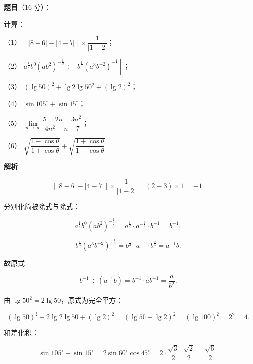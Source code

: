 \begin{answer}

\textbf{题目}（16 分）：

计算：

（1） $\left[\left|8-6\right|-\left|4-7\right|\right]\times\dfrac{1}{\left|1-2\right|}$；

（2） $a^{\frac12}b^0\left(ab^2\right)^{-\frac12}\div\left[b^{\frac13}\left(a^3b^{-2}\right)^{-\frac13}\right]$；

（3） $\left(\lg 50\right)^2+\lg 2\lg 50^2+\left(\lg 2\right)^2$；

（4） $\sin 105^\circ+\sin 15^\circ$；

（5） $\lim\limits_{n\to\infty}\dfrac{5-2n+3n^2}{4n^2-n-7}$；

（6） $\sqrt{\dfrac{1-\cos\theta}{1+\cos\theta}}+\sqrt{\dfrac{1+\cos\theta}{1-\cos\theta}}$

\textbf{解析}


\nopagebreak[4]
\[
\left[\left|8-6\right|-\left|4-7\right|\right]\times\frac{1}{\left|1-2\right|}
=(2-3)\times 1=-1.
\]


分别化简被除式与除式：

\nopagebreak[4]
\[
a^{\frac12}b^0\left(ab^2\right)^{-\frac12}
=a^{\frac12}\cdot a^{-\frac12}\cdot b^{-1}=b^{-1},
\]

\nopagebreak[4]
\[
b^{\frac13}\left(a^3b^{-2}\right)^{-\frac13}
=b^{\frac13}\cdot a^{-1}\cdot b^{\frac23}=a^{-1}b.
\]

故原式

\nopagebreak[4]
\[
b^{-1}\div\left(a^{-1}b\right)=b^{-1}\cdot a b^{-1}=\frac{a}{b^2}.
\]


由 $\lg 50^2=2\lg 50$，原式为完全平方：

\nopagebreak[4]
\[
\left(\lg 50\right)^2+2\lg 2\lg 50+\left(\lg 2\right)^2
=\left(\lg 50+\lg 2\right)^2
=\left(\lg 100\right)^2=2^2=4.
\]


和差化积：

\nopagebreak[4]
\[
\sin 105^\circ+\sin 15^\circ
=2\sin 60^\circ\cos 45^\circ
=2\cdot\frac{\sqrt3}{2}\cdot\frac{\sqrt2}{2}
=\frac{\sqrt6}{2}.
\]



\end{answer}
